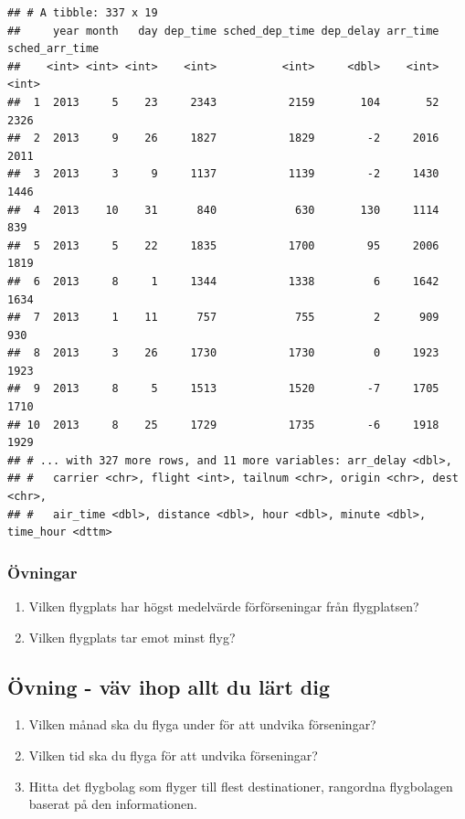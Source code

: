 \documentclass[
]{book}
\providecommand{\tightlist}{%
  \setlength{\itemsep}{0pt}\setlength{\parskip}{0pt}}
\begin{document}
\begin{verbatim}
## # A tibble: 337 x 19
##     year month   day dep_time sched_dep_time dep_delay arr_time sched_arr_time
##    <int> <int> <int>    <int>          <int>     <dbl>    <int>          <int>
##  1  2013     5    23     2343           2159       104       52           2326
##  2  2013     9    26     1827           1829        -2     2016           2011
##  3  2013     3     9     1137           1139        -2     1430           1446
##  4  2013    10    31      840            630       130     1114            839
##  5  2013     5    22     1835           1700        95     2006           1819
##  6  2013     8     1     1344           1338         6     1642           1634
##  7  2013     1    11      757            755         2      909            930
##  8  2013     3    26     1730           1730         0     1923           1923
##  9  2013     8     5     1513           1520        -7     1705           1710
## 10  2013     8    25     1729           1735        -6     1918           1929
## # ... with 327 more rows, and 11 more variables: arr_delay <dbl>,
## #   carrier <chr>, flight <int>, tailnum <chr>, origin <chr>, dest <chr>,
## #   air_time <dbl>, distance <dbl>, hour <dbl>, minute <dbl>, time_hour <dttm>
\end{verbatim}

\hypertarget{uxf6vningar-1}{%
\subsubsection{Övningar}\label{uxf6vningar-1}}

\begin{enumerate}
\def\labelenumi{\arabic{enumi}.}
\tightlist
\item
  Vilken flygplats har högst medelvärde förförseningar från flygplatsen?
\item
  Vilken flygplats tar emot minst flyg?
\end{enumerate}

\hypertarget{uxf6vning---vuxe4v-ihop-allt-du-luxe4rt-dig}{%
\subsection{Övning - väv ihop allt du lärt dig}\label{uxf6vning---vuxe4v-ihop-allt-du-luxe4rt-dig}}

\begin{enumerate}
\def\labelenumi{\arabic{enumi}.}
\tightlist
\item
  Vilken månad ska du flyga under för att undvika förseningar?
\item
  Vilken tid ska du flyga för att undvika förseningar?
\item
  Hitta det flygbolag som flyger till flest destinationer, rangordna flygbolagen baserat på den informationen.
\end{enumerate}
\end{document}
